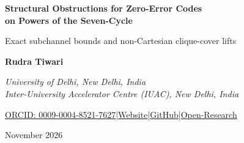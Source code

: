 \documentclass[11pt,letterpaper]{article}
\theoremstyle{definition}
\theoremstyle{remark}
\begin{document}
\thispagestyle{empty}
\begin{center}
\vspace*{0.22in}
{\LARGE\bfseries Structural Obstructions for Zero-Error Codes\\[.14em] on Powers of the Seven-Cycle\par}
\vspace{0.20in}
{\large Exact subchannel bounds and non-Cartesian clique-cover lifts\par}
\vspace{0.24in}
{\normalsize\bfseries Rudra Tiwari\par}
\vspace{0.03in}
{\normalsize\itshape University of Delhi, New Delhi, India\\Inter-University Accelerator Centre (IUAC), New Delhi, India\par}
\vspace{0.10in}
{\small\href{https://orcid.org/0009-0004-8521-7627}{ORCID: 0009-0004-8521-7627}\quad|\quad\href{https://rtx09x.github.io/}{Website}\quad|\quad\href{https://github.com/Rtx09x}{GitHub}\quad|\quad\href{https://github.com/Rtx09x/Open-Research/tree/main/mathematics/seven-cycle-shannon-capacity}{Open-Research}\par}
\vspace{0.15in}
{\normalsize November 2026\par}
\end{center}
\vspace{0.16in}
\end{document}

